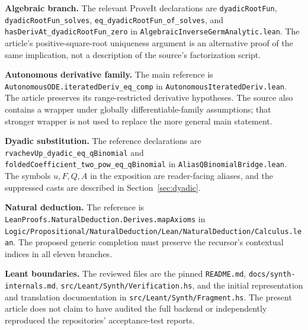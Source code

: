 \documentclass[11pt,a4paper]{article}
\theoremstyle{remark}
\newcommand{\ty}[1]{\texttt{#1}}
\begin{document}
\textbf{Algebraic branch.} The relevant ProveIt declarations are \ty{dyadicRootFun}, \ty{dyadicRootFun\_solves}, \ty{eq\_dyadicRootFun\_of\_solves}, and \ty{hasDerivAt\_dyadicRootFun\_zero} in \ty{AlgebraicInverseGermAnalytic.lean}. The article's positive-square-root uniqueness argument is an alternative proof of the same implication, not a description of the source's factorization script.\cite{proveit-root}

\textbf{Autonomous derivative family.} The main reference is \ty{AutonomousODE.iteratedDeriv\_eq\_comp} in \ty{AutonomousIteratedDeriv.lean}. The article preserves its range-restricted derivative hypotheses. The source also contains a wrapper under globally differentiable-family assumptions; that stronger wrapper is not used to replace the more general main statement.\cite{proveit-ode}

\textbf{Dyadic substitution.} The reference declarations are \ty{rvachevUp\_dyadic\_eq\_qBinomial} and \ty{foldedCoefficient\_two\_pow\_eq\_qBinomial} in \ty{AliasQBinomialBridge.lean}. The symbols $u,F,Q,A$ in the exposition are reader-facing aliases, and the suppressed casts are described in Section~\ref{sec:dyadic}.\cite{proveit-alias}

\textbf{Natural deduction.} The reference is \ty{LeanProofs.NaturalDeduction.Derives.mapAxioms} in \ty{Logic/Propositional/NaturalDeduction/Lean/NaturalDeduction/Calculus.lean}. The proposed generic completion must preserve the recursor's contextual indices in all eleven branches.\cite{proveit-nd}

\textbf{Leant boundaries.} The reviewed files are the pinned \ty{README.md}, \ty{docs/synth-internals.md}, \ty{src/Leant/Synth/Verification.hs}, and the initial representation and translation documentation in \ty{src/Leant/Synth/Fragment.hs}. The present article does not claim to have audited the full backend or independently reproduced the repositories' acceptance-test reports.\cite{leant-readme,leant-internals,leant-verification,leant-fragment}
\end{document}
